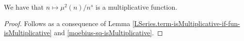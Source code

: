 \begin{theorem}
\label{moebius_sq_LSeries.term_isMultiplicative}
\leanok
We have that $n\mapsto \mu^2(n)/n^{s}$ is a multiplicative function.
\end{theorem}
\begin{proof}
\leanok
Follows as a consequence of Lemma \ref{LSeries.term-isMultiplicative-if-fun-isMultiplicative}
    and \ref{moebius-sq-isMultiplicative}.
\end{proof}
